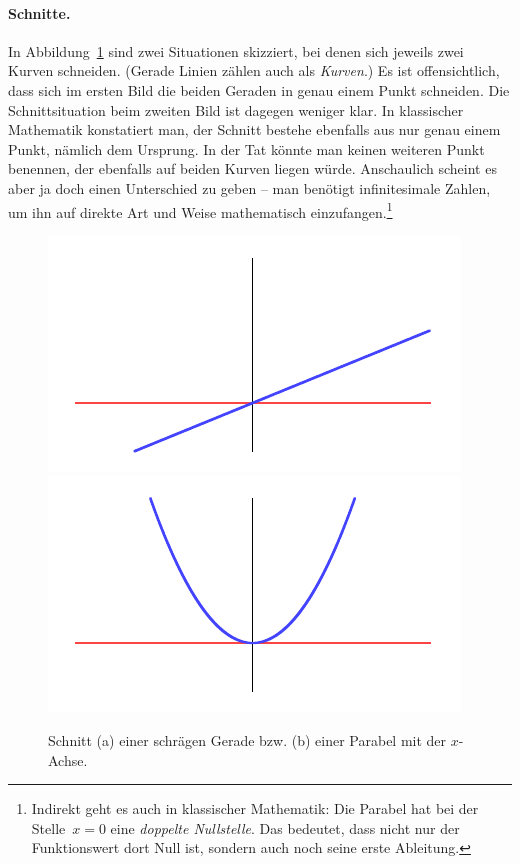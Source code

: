 \documentclass{zirkelblatt}
\theoremstyle{definition}
\theoremstyle{plain}
\theoremstyle{remark}
\begin{document}
\paragraph{Schnitte.} In Abbildung~\ref{fig:schnittverhalten} sind zwei Situationen skizziert, bei
denen sich jeweils zwei Kurven schneiden. (Gerade Linien zählen
auch als \emph{Kurven}.) Es ist offensichtlich, dass sich im ersten
Bild die beiden Geraden in genau einem Punkt schneiden. Die Schnittsituation
beim zweiten Bild ist dagegen weniger klar. In klassischer Mathematik konstatiert man,
der Schnitt bestehe ebenfalls aus nur genau einem Punkt, nämlich dem Ursprung.
In der Tat könnte man keinen weiteren Punkt benennen, der ebenfalls auf beiden
Kurven liegen würde. Anschaulich scheint es aber ja doch einen Unterschied zu
geben -- man benötigt infinitesimale Zahlen, um ihn auf direkte Art und Weise
mathematisch einzufangen.\footnote{Indirekt geht es auch in klassischer
Mathematik: Die Parabel hat bei der Stelle~$x = 0$ eine \emph{doppelte
Nullstelle}. Das bedeutet, dass nicht nur der Funktionswert dort Null ist,
sondern auch noch seine erste Ableitung.}
\begin{figure}[b]
  \centering
  \includegraphics{sdg-schnittverhalten1}
  \includegraphics{sdg-schnittverhalten2}
  \caption{\label{fig:schnittverhalten}Schnitt (a) einer schrägen Gerade
  bzw. (b) einer Parabel mit der $x$-Achse.}
\end{figure}
\end{document}
